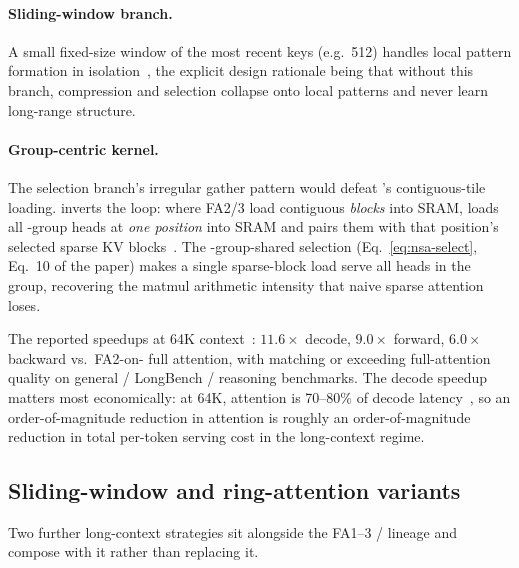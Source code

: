 \paragraph{Sliding-window branch.} A small fixed-size window of the
most recent keys (e.g.\ 512) handles local pattern formation in
isolation~\citep[\S 3.3.3]{yuan2025}, the explicit design rationale
being that without this branch, compression and selection collapse
onto local patterns and never learn long-range structure.

\paragraph{Group-centric kernel.} The selection branch's irregular
gather pattern would defeat 's contiguous-tile loading.
 inverts the loop: where FA2/3 load contiguous \emph{ blocks}
into SRAM,  loads all -group heads at \emph{one  position}
into SRAM and pairs them with that position's selected sparse KV
blocks~\citep[\S 3.4]{yuan2025}. The -group-shared selection
(Eq.~\eqref{eq:nsa-select}, Eq.~10 of the paper) makes a single
sparse-block load serve all heads in the group, recovering the matmul
arithmetic intensity that naive sparse attention loses.

The reported speedups at 64K context~\citep[Fig.~1]{yuan2025}:
$11.6\times$ decode, $9.0\times$ forward, $6.0\times$ backward vs.\
FA2-on- full attention, with  matching or exceeding full-attention
quality on general / LongBench / reasoning benchmarks. The decode
speedup matters most economically: at 64K, attention is 70--80\% of
decode latency~\citep[\S 1]{yuan2025}, so an order-of-magnitude
reduction in attention is roughly an order-of-magnitude reduction in
total per-token serving cost in the long-context regime.

\subsection{Sliding-window and ring-attention variants}
\label{sec:sliding-ring}

Two further long-context strategies sit alongside the FA1--3 / 
lineage and compose with it rather than replacing it.

